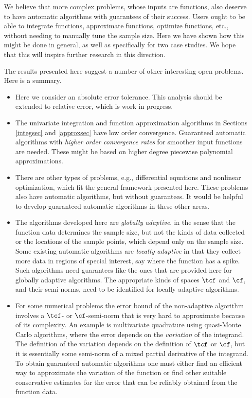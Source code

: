 \documentclass[]{elsarticle}
\theoremstyle{definition}
\theoremstyle{remark}
\begin{document}
We believe that more complex problems, whose inputs are functions, also deserve to have automatic algorithms with guarantees of their success.  Users ought to be able to integrate functions, approximate functions, optimize functions, etc., without needing to manually tune the sample size.  Here we have shown how this might be done in general, as well as specifically for two case studies.  We hope that this will inspire further research in this direction.



The results presented here suggest a number of other interesting open problems.  Here is a summary.

\begin{itemize}

\item Here we consider an absolute error tolerance.  This analysis should be extended to relative error, which is work in progress.  

\item The univariate integration and function approximation algorithms in Sections \ref{integsec} and \ref{approxsec} have low order convergence.  Guaranteed automatic algorithms with \emph{higher order convergence rates} for smoother input functions are needed.  These might be based on higher degree piecewise polynomial approximations.

\item There are other types of problems, e.g., differential equations and nonlinear optimization, which fit the general framework presented here.  These problems also have automatic algorithms, but without guarantees.  It would be helpful to develop guaranteed automatic algorithms in these other areas.

\item The algorithms developed here are \emph{globally adaptive}, in the sense that the function data determines the sample size, but not the kinds of data collected or the locations of the sample points, which depend only on the sample size.  Some existing automatic algorithms are \emph{locally adaptive} in that they collect more data in regions of special interest, say where the function has a spike.  Such algorithms need guarantees like the ones that are provided here for globally adaptive algorithms.  The appropriate kinds of spaces $\tcf$ and $\cf$, and their semi-norms, need to be identified for locally adaptive algorithms.

\item For some numerical problems the error bound of the non-adaptive algorithm involves a $\tcf$- or $\cf$-semi-norm that is very hard to approximate because of its complexity.  An example is multivariate quadrature using quasi-Monte Carlo algorithms, where the error depends on the \emph{variation} of the integrand.  The definition of the variation depends on the definition of $\tcf$ or $\cf$, but it is essentially some semi-norm of a mixed partial derivative of the integrand.  To obtain guaranteed automatic algorithms one must either find an efficient way to approximate the variation of the function or find other suitable conservative estimates for the error that can be reliably obtained from the function data.  


\end{itemize}
\end{document}
